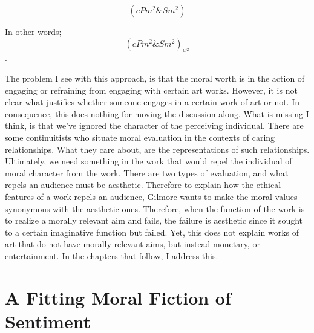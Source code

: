 \documentclass[12pt]{book}
\theoremstyle{definition}
\theoremstyle{remark}
\begin{document}
\[( cPm^{2} \& Sm^{2} )\]

\noindent In other words; \[( cPm^{2} \& Sm^{2} )_{w^{2}}\].

The problem I see with this approach, is that the moral worth is in the action of engaging or refraining from engaging with certain art works. However, it is not clear what justifies whether someone engages in a certain work of art or not. In consequence, this does nothing for moving the discussion along. What is missing I think, is that we've ignored the character of the perceiving individual. There are some continuitists who situate moral evaluation in the contexts of caring relationships. What they care about, are the representations of such relationships. Ultimately, we need something in the work that would repel the individual of moral character from the work. There are two types of evaluation, and what repels an audience must be aesthetic. Therefore to explain how the ethical features of a work repels an audience, Gilmore wants to make the moral values synonymous with the aesthetic ones. Therefore, when the function of the work is to realize a morally relevant aim and fails, the failure is aesthetic since it sought to a certain imaginative function but failed. Yet, this does not explain works of art that do not have morally relevant aims, but instead monetary, or entertainment. In the chapters that follow, I address this.

\chapter{A Fitting Moral Fiction of Sentiment}\label{a-fitting-moral-fiction-of-sentiment}
\end{document}
